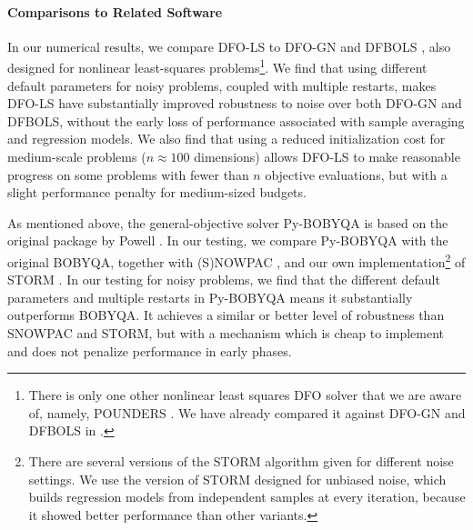 

\paragraph{Comparisons to Related Software}
In our numerical results, we compare DFO-LS to DFO-GN \cite{Cartis2017a} and DFBOLS \cite{Zhang2010}, also designed for nonlinear least-squares problems\footnote{There is only 
one other nonlinear least squares DFO solver that we are aware of, namely, POUNDERS \cite{Wild2017}. We have already compared it against DFO-GN
and DFBOLS in \cite{Cartis2017a}.}.
We find that using different default parameters for noisy problems, coupled with multiple restarts, makes DFO-LS have substantially improved robustness to noise over both DFO-GN and DFBOLS, without the early loss of performance associated with sample averaging and regression models.
We also find that using a reduced initialization cost for medium-scale problems ($n\approx 100$ dimensions) allows DFO-LS to make reasonable progress on some problems with fewer than $n$ objective evaluations, but with a slight performance penalty for medium-sized budgets.

As mentioned above, the general-objective solver Py-BOBYQA is based on the original package by Powell \cite{Powell2009,Zhang_URL}.
In our testing, we compare Py-BOBYQA with the original BOBYQA, together with (S)NOWPAC \cite{Augustin2014,Augustin2017}, and our own implementation\footnote{\:There are several versions of the STORM algorithm given for different noise settings. We use the version of STORM designed for unbiased noise, which builds regression models from independent samples at every iteration, because it showed better performance than other variants.} of STORM \cite{Chen2016}.
In our testing for noisy problems, we find that the different default parameters and multiple restarts in Py-BOBYQA means it substantially outperforms BOBYQA.
It achieves a similar or better level of robustness than SNOWPAC and STORM, but with a mechanism which is cheap to implement and does not penalize performance in early phases.

